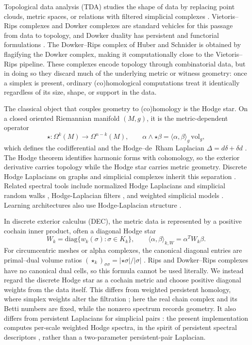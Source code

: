 \documentclass[11pt]{amsart}
\theoremstyle{plain}
\begin{document}
Topological data analysis (TDA) studies the shape of data by replacing point clouds, metric spaces,
or relations with filtered simplicial complexes \cite{edelsbrunner2010computational}. Vietoris--Rips
complexes and Dowker complexes \cite{dowker1952homology} are standard vehicles for this passage
from data to topology, and Dowker duality has persistent and functorial formulations
\cite{chowdhury2018functorial}. The Dowker--Rips complex of Huber and Schnider
\cite{huber2025flagifying} is obtained by flagifying the Dowker complex, making it computationally
close to the Vietoris--Rips pipeline. These complexes encode topology through combinatorial data,
but in doing so they discard much of the underlying metric or witness geometry: once a simplex is
present, ordinary (co)homological computations treat it identically regardless of its size, shape,
or support in the data.

The classical object that couples geometry to (co)homology is the Hodge star. On a closed oriented
Riemannian manifold $(M,g)$, it is the metric-dependent operator
\[
\star : \Omega^k(M) \to \Omega^{n-k}(M),
\qquad
\alpha\wedge\star\beta = \langle\alpha,\beta\rangle_g\,\mathrm{vol}_g,
\]
which defines the codifferential and the Hodge--de~Rham Laplacian
$\Delta=d\delta+\delta d$ \cite{warner1983foundations,rosenberg1997laplacian}. The Hodge theorem
identifies harmonic forms with cohomology, so the exterior derivative carries topology while the
Hodge star carries metric geometry. Discrete Hodge Laplacians on graphs and simplicial complexes
inherit this separation \cite{lim2020hodge,horak2013spectra}. Related spectral tools include
normalized Hodge Laplacians and simplicial random walks \cite{schaub2018random}, Hodge-Laplacian
filters \cite{yang2022simplicialfilters,yang2023convolutional}, and weighted simplicial models
\cite{battiloro2023weighted}. Learning architectures also use Hodge-Laplacian structure
\cite{smirnov2021hodgenet,ebli2020simplicial}.

In discrete exterior calculus (DEC), the metric data is represented by a positive cochain inner
product, often a diagonal Hodge star
\[
W_k=\mathrm{diag}\{w_k(\sigma):\sigma\in K_k\},
\qquad
\langle\alpha,\beta\rangle_{k,W}=\alpha^TW_k\beta.
\]
For circumcentric meshes or alpha complexes, the canonical diagonal entries are primal--dual volume
ratios $(\star_k)_{\sigma\sigma}=|\star\sigma|/|\sigma|$
\cite{hirani2003dec,desbrun2005dec}. Rips and Dowker--Rips complexes have no canonical dual cells,
so this formula cannot be used literally. We instead regard the discrete Hodge star as a cochain
metric and choose positive diagonal weights from the data itself. This differs from weighted
persistent homology, where simplex weights alter the filtration
\cite{ren2018weighted,meng2019weighted}; here the real chain complex and its Betti numbers are fixed,
while the nonzero spectrum records geometry. It also differs from persistent Laplacians for
simplicial pairs \cite{memoli2020persistent}: the present implementation computes per-scale weighted
Hodge spectra, in the spirit of persistent spectral descriptors \cite{wang2020persistent}, rather
than a two-parameter persistent-pair Laplacian.
\end{document}
